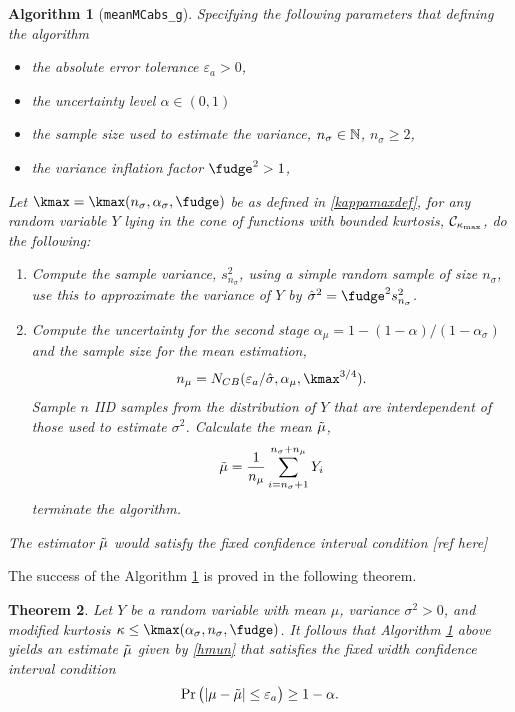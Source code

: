 \documentclass{iitthesis}
\newtheorem{theorem}{Theorem}[section]
\newtheorem{algorithm}[theorem]{Algorithm}
\begin{document}
\begin{algorithm}[{\tt meanMCabs\_g}]\label{meanMCabsg}
Specifying the following parameters that defining the algorithm
\begin{itemize}
\item the absolute error tolerance $\varepsilon_a >0$,
\item the uncertainty level $\alpha \in (0,1)$
\item the sample size used to estimate the variance, $n_{\sigma} \in \mathbb{N}$, $n_{\sigma} \geq 2$,
\item the variance inflation factor $\fudge^2 >1$,
\end{itemize}
Let $\kmax=\kmax(n_\sigma,\alpha_\sigma,\fudge)$ be as defined in \eqref{kappamaxdef}, for any random variable $Y$ lying in the cone of functions with bounded kurtosis, $\mathcal{C}_{\kappa_{\max}}$, do the following:
\begin{enumerate}
\item Compute the sample variance, $s^2_{n_{\sigma}}$, using a simple random sample of size $n_\sigma$, use this to approximate the variance of $Y$ by $\hsigma^2 = \fudge^2 s^2_{n_\sigma}$. 

\item Compute the uncertainty for the second stage $\alpha_\mu = 1-(1-\alpha)/(1-\alpha_{\sigma})$ and the sample size for the mean estimation,
\begin{align}\label{NCBmeanMCabs}
n_\mu = N_{CB} (\varepsilon_a/\hsigma,\alpha_\mu, \kmax^{3/4}).
\end{align}
Sample $n$ IID samples from the distribution of $Y$ that are interdependent of those used to estimate $\sigma^2$. Calculate the mean $\tilde{\mu}$,
\begin{align}\label{hmun}
\tilde{\mu} = \frac{1}{n_\mu}\sum_{i = n_\sigma+1}^{n_\sigma+n_\mu}Y_i
\end{align}
 terminate the algorithm. 
\end{enumerate}
The estimator $\tilde{\mu}$ would satisfy the fixed confidence interval condition [ref here]
\end{algorithm}
The success of the Algorithm \ref{meanMCabsg} is proved in the following theorem.
\begin{theorem}
Let $Y$ be a random variable with mean $\mu$, variance $\sigma^2 >0$, and modified kurtosis $\kappa \leq \kmax(\alpha_{\sigma},n_{\sigma},\fudge)$. It follows that Algorithm \ref{meanMCabsg} above yields an estimate $\tilde{\mu}$ given by \eqref{hmun} that satisfies the fixed width confidence interval condition
\begin{align}
\Pr\left( \left \lvert \mu-\tilde{\mu} \right \rvert \leq \varepsilon_a \right) \geq 1-\alpha.
\end{align}
\end{theorem}
\end{document}
